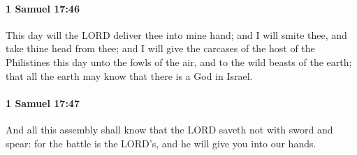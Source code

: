 		\paragraph{1 Samuel 17:46} %
			\label{1SAMUEL-17-46}

			This day will the LORD deliver thee into mine hand; and I will smite thee, and take thine head from thee; and I will give the carcases of the host of the Philistines this day unto the fowls of the air, and to the wild beasts of the earth; that all the earth may know that there is a God in Israel.


		\paragraph{1 Samuel 17:47} %
			\label{1SAMUEL-17-47}

			And all this assembly shall know that the LORD saveth not with sword and spear: for the battle is the LORD’s, and he will give you into our hands.

